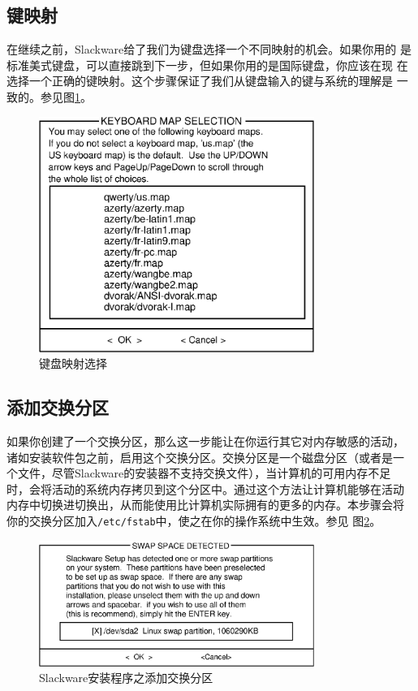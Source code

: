 \subsection{键映射}
\label{sec:installation:setup:keymap}

在继续之前，Slackware给了我们为键盘选择一个不同映射的机会。如果你用的
是标准美式键盘，可以直接跳到下一步，但如果你用的是国际键盘，你应该在现
在选择一个正确的键映射。这个步骤保证了我们从键盘输入的键与系统的理解是
一致的。参见图\ref{fig:setup-keymap}。

\begin{figure}[htpb]
  \centering
  \includegraphics[width=0.8\textwidth]{images/installation/setup-keymap.eps}
  \caption{键盘映射选择}
  \label{fig:setup-keymap}
\end{figure}

\subsection{添加交换分区}
\label{sec:installation:setup:addSwap}

如果你创建了一个交换分区，那么这一步能让在你运行其它对内存敏感的活动，
诸如安装软件包之前，启用这个交换分区。交换分区是一个磁盘分区（或者是一
个文件，尽管Slackware的安装器不支持交换文件），当计算机的可用内存不足
时，会将活动的系统内存拷贝到这个分区中。通过这个方法让计算机能够在活动
内存中切换进切换出，从而能使用比计算机实际拥有的更多的内存。本步骤会将
你的交换分区加入\texttt{/etc/fstab}中，使之在你的操作系统中生效。参见
图\ref{fig:setup-swap}。
\begin{figure}[htpb]
  \centering
  \includegraphics[width=0.8\textwidth]{images/installation/setup-swap}
  \caption{Slackware安装程序之添加交换分区}
  \label{fig:setup-swap}
\end{figure}

